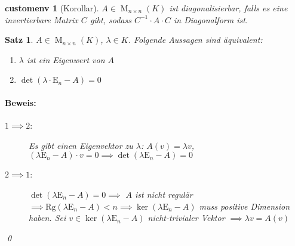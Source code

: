 \documentclass{report}
\newcommand{\lb}{\lambda}
\DeclareMathOperator{\MM}{M}
\newcommand{\En}{\mathrm{E}_n}
\theoremstyle{customrem}
\theoremstyle{customdef}
\newtheorem*{satz*}{Satz} %
\renewenvironment{proof}{\paragraph{Beweis: }}{\qed}
\theoremstyle{customenv}
\newtheorem*{customenv}{customenv} %
\begin{document}
	\begin{customenv}[Korollar]
		\(A\in\MM_{n\times n}(K)\) ist diagonalisierbar, falls es eine invertierbare Matrix \(C\) gibt, sodass \(C^{-1}\cdot A\cdot C\) in Diagonalform ist.
	\end{customenv}

	\begin{satz*}
		\(A\in\MM_{n\times n}(K)\), \(\lb\in K\). Folgende Aussagen sind äquivalent:
		\begin{enumerate}
			\item \(\lb\) ist ein Eigenwert von \(A\)
			\item \(\det(\lb\cdot\En-A)=0\)
		\end{enumerate}

		\begin{proof}
			\begin{description}
				\item[\(1\implies 2\)\normalfont:] Es gibt einen Eigenvektor zu \(\lb\): \(A(v)=\lb v\), \((\lb\En-A)\cdot v=0 \implies \det(\lb\En-A)=0\)
				\item[\(2\implies 1\)\normalfont:] \(\det(\lb\En-A) = 0\implies\) \(A\) ist nicht regulär \(\implies \mathrm{Rg}(\lb\En-A)<n \implies\ker(\lb\En-A)\) muss positive Dimension haben. Sei \(v\in\ker(\lb\En-A)\) nicht-trivialer Vektor \(\implies \lb v=A(v)\)
			\end{description}
		\end{proof}
	\end{satz*}
\end{document}

